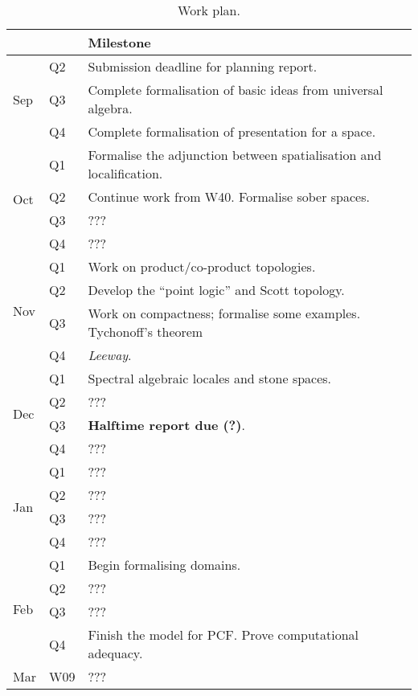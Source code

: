 \documentclass{article}
\begin{document}
\begin{table}[]\caption{Work plan.}\label{table:plan}
\begin{tabular}{lll}
                     &     & Milestone \\\hline \hline
\multirow{3}{*}{Sep} & Q2  & Submission deadline for planning report. \\
                     & Q3  & Complete formalisation of basic ideas from universal algebra. \\
                     & Q4  & Complete formalisation of presentation for a space. \\ \hline
\multirow{4}{*}{Oct} & Q1  & Formalise the adjunction between spatialisation and localification. \\
                     & Q2  & Continue work from W40. Formalise sober spaces. \\
                     & Q3  & ??? \\
                     & Q4  & ??? \\ \hline
\multirow{4}{*}{Nov} & Q1  & Work on product/co-product topologies. \\
                     & Q2  & Develop the ``point logic'' and Scott topology. \\
                     & Q3  & Work on compactness; formalise some examples. Tychonoff's theorem \\
                     & Q4  & \emph{Leeway}. \\ \hline
\multirow{4}{*}{Dec} & Q1  & Spectral algebraic locales and stone spaces. \\
                     & Q2  & ??? \\
                     & Q3  & \textbf{Halftime report due (?)}. \\
                     & Q4  & ??? \\ \hline
\multirow{4}{*}{Jan} & Q1  & ??? \\
                     & Q2  & ??? \\
                     & Q3  & ??? \\
                     & Q4  & ??? \\ \hline
\multirow{4}{*}{Feb} & Q1  & Begin formalising domains. \\
                     & Q2  & ??? \\
                     & Q3  & ??? \\
                     & Q4  & Finish the model for PCF. Prove computational adequacy. \\ \hline
\multirow{4}{*}{Mar} & W09  & ??? \\

\end{tabular}
\end{table}
\end{document}
